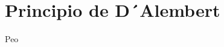 \documentclass[../main.tex]{subfiles}
\begin{document}
\section{Principio de D´Alembert}
Peo
\end{document}
